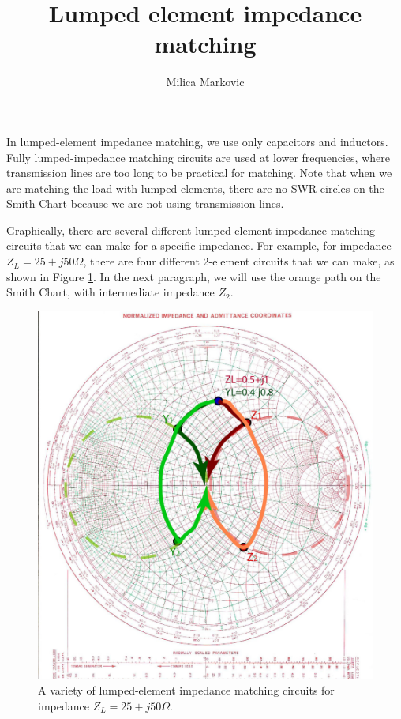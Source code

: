 \documentclass{ximera}
\title{Lumped element impedance matching}
\author{Milica Markovic}
\begin{document}
  
\begin{abstract}  

\end{abstract}  
\maketitle    


In lumped-element impedance matching, we use only capacitors and inductors. Fully lumped-impedance matching circuits are used at lower frequencies, where transmission lines are too long to be practical for matching. Note that when we are matching the load with lumped elements, there are no SWR circles on the Smith Chart because we are not using transmission lines.

Graphically, there are several different lumped-element impedance matching circuits that we can make for a specific impedance. For example, for impedance $Z_L=25+j50 \Omega$, there are four different 2-element circuits that we can make, as shown in Figure \ref{fig:LumpedVariety}. In the next paragraph, we will use the orange path on the Smith Chart, with intermediate impedance $Z_2$.



\begin{figure}[htbp]
\begin{center}
\includegraphics[scale=0.85]{../jpg/LumpedVariety-01.jpg}
\end{center}
\caption{A variety of lumped-element impedance matching circuits for impedance $Z_L=25+j50 \Omega$.}
\label{fig:LumpedVariety}
\end{figure}
\end{document}
